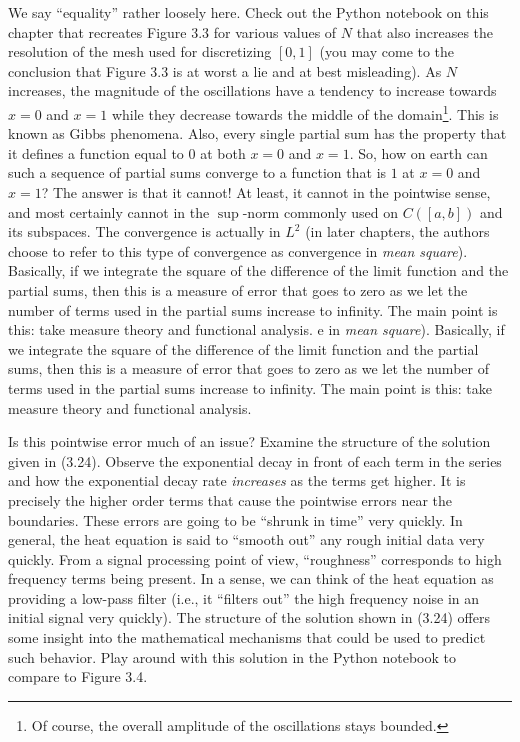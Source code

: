 \documentclass{amsart}
\theoremstyle{plain}
\theoremstyle{definition}
\theoremstyle{remark}
\theoremstyle{definition}
\numberwithin{equation}{section}
\numberwithin{equation}{section}
\begin{document}
We say ``equality'' rather loosely here. 
Check out the Python notebook on this chapter that recreates Figure 3.3 for various values of $N$ that also increases the resolution of the mesh used for discretizing $[0,1]$ (you may come to the conclusion that Figure 3.3 is at worst a lie and at best misleading). 
As $N$ increases, the magnitude of the oscillations have a tendency to increase towards $x=0$ and $x=1$ while they decrease towards the middle of the domain\footnote{Of course, the overall amplitude of the oscillations stays bounded.}. 
This is known as Gibbs phenomena.
Also, every single partial sum has the property that it defines a function equal to $0$ at both $x=0$ and $x=1$.
So, how on earth can such a sequence of partial sums converge to a function that is $1$ at $x=0$ and $x=1$?
The answer is that it cannot!
At least, it cannot in the pointwise sense, and most certainly cannot in the $\sup$-norm commonly used on $C([a,b])$ and its subspaces.
The convergence is actually in $L^2$ (in later chapters, the authors choose to refer to this type of convergence as convergence in {\em mean square}). 
Basically, if we integrate the square of the difference of the limit function and the partial sums, then this is a measure of error that goes to zero as we let the number of terms used in the partial sums increase to infinity. 
The main point is this: take measure theory and functional analysis. e in {\em mean square}). 
Basically, if we integrate the square of the difference of the limit function and the partial sums, then this is a measure of error that goes to zero as we let the number of terms used in the partial sums increase to infinity. 
The main point is this: take measure theory and functional analysis. 

Is this pointwise error much of an issue?
Examine the structure of the solution given in (3.24).
Observe the exponential decay in front of each term in the series and how the exponential decay rate {\em increases} as the terms get higher.
It is precisely the higher order terms that cause the pointwise errors near the boundaries.
These errors are going to be ``shrunk in time'' very quickly.
In general, the heat equation is said to ``smooth out'' any rough initial data very quickly.
From a signal processing point of view, ``roughness'' corresponds to high frequency terms being present. 
In a sense, we can think of the heat equation as providing a low-pass filter (i.e., it ``filters out'' the high frequency noise in an initial signal very quickly).  
The structure of the solution shown in (3.24) offers some insight into the mathematical mechanisms that could be used to predict such behavior. 
Play around with this solution in the Python notebook to compare to Figure 3.4.
\end{document}
